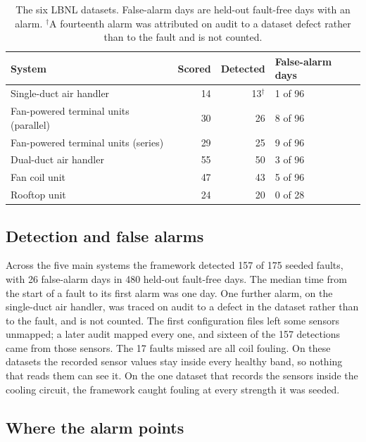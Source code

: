 \documentclass[conference]{IEEEtran}
\begin{document}
\begin{table}[t]
\centering
\caption{The six LBNL datasets. False-alarm days are held-out fault-free days with an alarm. $^{\dagger}$A fourteenth alarm was attributed on audit to a dataset defect rather than to the fault and is not counted.}
\label{tab:systems}
\footnotesize
\setlength{\tabcolsep}{4pt}
\begin{tabular}{@{}>{\raggedright\arraybackslash}p{}rrl@{}}
\toprule
System & Scored & Detected & False-alarm days \\
\midrule
Single-duct air handler & 14 & 13$^{\dagger}$ & 1 of 96 \\
Fan-powered terminal units (parallel) & 30 & 26 & 8 of 96 \\
Fan-powered terminal units (series) & 29 & 25 & 9 of 96 \\
Dual-duct air handler & 55 & 50 & 3 of 96 \\
Fan coil unit & 47 & 43 & 5 of 96 \\
Rooftop unit & 24 & 20 & 0 of 28 \\
\bottomrule
\end{tabular}
\end{table}

\subsection{Detection and false alarms}

Across the five main systems the framework detected 157 of 175 seeded faults, with 26 false-alarm days in 480 held-out fault-free days. The median time from the start of a fault to its first alarm was one day. One further alarm, on the single-duct air handler, was traced on audit to a defect in the dataset rather than to the fault, and is not counted. The first configuration files left some sensors unmapped; a later audit mapped every one, and sixteen of the 157 detections came from those sensors. The 17 faults missed are all coil fouling. On these datasets the recorded sensor values stay inside every healthy band, so nothing that reads them can see it. On the one dataset that records the sensors inside the cooling circuit, the framework caught fouling at every strength it was seeded.

\subsection{Where the alarm points}
\end{document}
